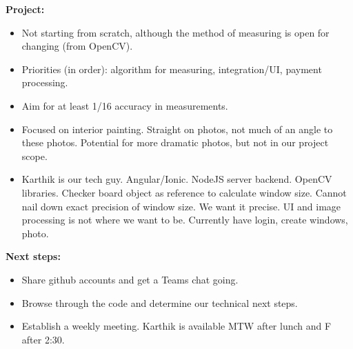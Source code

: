 \documentclass[a4paper, 10pt]{article}
\begin{document}
\textbf{Project:}
\begin{itemize}
\item Not starting from scratch, although the method of measuring is open for changing (from OpenCV).
\item Priorities (in order): algorithm for measuring, integration/UI, payment processing.
\item Aim for at least 1/16 accuracy in measurements.
\item Focused on interior painting. Straight on photos, not much of an angle to these photos. Potential for more dramatic photos, but not in our project scope.
\item Karthik is our tech guy. Angular/Ionic. NodeJS server backend. OpenCV libraries. Checker board object as reference to calculate window size. Cannot nail down exact precision of window size. We want it precise. UI and image processing is not where we want to be. Currently have login, create windows, photo.
\end{itemize}

\textbf{Next steps:}
\begin{itemize}
\item Share github accounts and get a Teams chat going.
\item Browse through the code and determine our technical next steps.
\item Establish a weekly meeting. Karthik is available MTW after lunch and F after 2:30.
\end{itemize}
\end{document}

